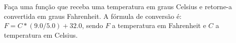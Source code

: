 
\question[10]

Faça uma função que receba uma temperatura em graus Celsius e retorne-a convertida em graus Fahrenheit. A fórmula de conversão é: $F = C * (9.0/5.0) + 32.0$, sendo $F$ a temperatura em Fahrenheit e $C$ a temperatura em Celsius.


